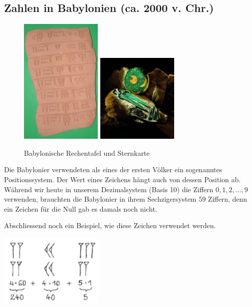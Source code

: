 \documentclass[%
11pt,%
twoside,%
titlepage,%
swissgerman,%
headsepline%
]{scrartcl}
\newcommand{\definition}[1]{\colorbox{emerald}{#1}}
\theoremstyle{definition}
\theoremstyle{plain}
\begin{document}
\subsection{Zahlen in Babylonien (ca. 2000 v. Chr.)}
\begin{figure}[h]
\begin{center}
\includegraphics[width=0.35\textwidth]{pictures/babylontafel}\hspace*{0.2cm}
\includegraphics[width=0.35\textwidth]{pictures/babylonuhr}
\end{center}
\caption{Babylonische Rechentafel und Sternkarte}
\end{figure}
Die Babylonier verwendeten als eines der ersten Völker ein sogenanntes \definition{Positionssystem}. Der Wert eines Zeichens hängt auch von dessen Position ab. Während wir heute in unserem Dezimalsystem (Basis 10) die Ziffern $0, 1, 2, \dots, 9$ verwenden, brauchten die Babylonier in ihrem Sechzigersystem $59$ Ziffern, denn ein Zeichen für die Null gab es damals noch nicht.

Abschliessend noch ein Beispiel, wie diese Zeichen verwendet werden.
\begin{center}
\includegraphics[width=5cm]{pictures/babylon285}
\end{center}
\end{document}

